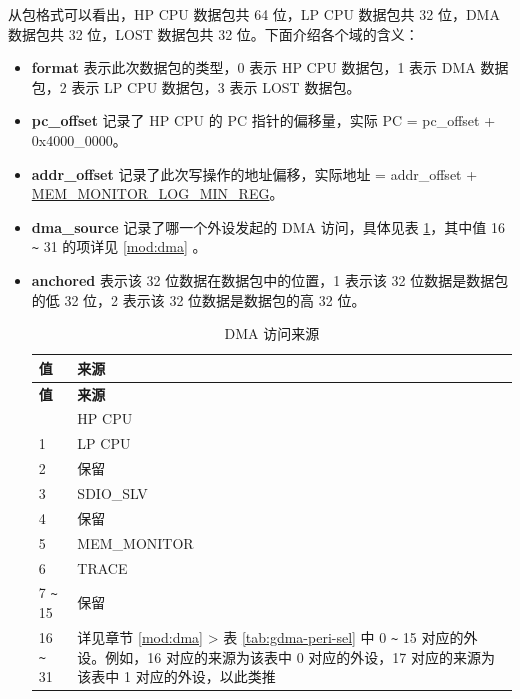 \documentclass[main\_\_CN.tex]{subfiles}
\begin{document}
从包格式可以看出，HP CPU 数据包共 64 位，LP CPU 数据包共 32 位，DMA 数据包共 32 位，LOST 数据包共 32 位。下面介绍各个域的含义：
\begin{itemize}
    \item {\bfseries format} 表示此次数据包的类型，0 表示 HP CPU 数据包，1 表示 DMA 数据包，2 表示 LP CPU 数据包，3 表示 LOST 数据包。
    \item {\bfseries pc\_offset} 记录了 HP CPU 的 PC 指针的偏移量，实际 PC = pc\_offset + 0x4000\_0000。
    \item {\bfseries addr\_offset} 记录了此次写操作的地址偏移，实际地址 = addr\_offset + \hyperref[regdesc:MEMMONITORLOGMINREG]{MEM\_MONITOR\_LOG\_MIN\_REG}。
    \item {\bfseries dma\_source} 记录了哪一个外设发起的 DMA 访问，具体见表 \ref{tab:dma_source}，其中值 16 \verb+~+ 31 的项详见 \ref{mod:dma} \textit{}。
    \item {\bfseries anchored} 表示该 32 位数据在数据包中的位置，1 表示该 32 位数据是数据包的低 32 位，2 表示该 32 位数据是数据包的高 32 位。
    
        \begin{longtable}{|l| m{8cm} |}
        \caption{DMA 访问来源}\label{tab:dma_source}
        \\\hline
        \rowcolor{lightgray}
        {\bfseries 值} & {\bfseries 来源} \\\hline
        \endfirsthead \hline \rowcolor{lightgray}
        {\bfseries 值} & {\bfseries 来源} \\\hline
        \endhead \endfoot \hline \endlastfoot
        0 & HP CPU \\\hline
        1 & LP CPU \\\hline
        2 & 保留 \\\hline
        3 & SDIO\_SLV \\\hline
        4 & 保留 \\\hline
        5 & MEM\_MONITOR \\\hline
        6 & TRACE \\\hline 
        7 \verb+~+ 15 & 保留 \\\hline
        16 \verb+~+ 31 & 详见章节 \ref{mod:dma} \textit{\nameref{mod:dma}} > 表  \ref{tab:gdma-peri-sel} 中 0 \verb+~+ 15 对应的外设。例如，16 对应的来源为该表中 0 对应的外设，17 对应的来源为该表中 1 对应的外设，以此类推 \\\hline
        \end{longtable}
\end{itemize}
\end{document}
